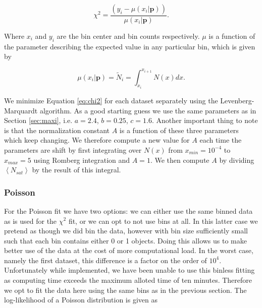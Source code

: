 \begin{equation}
    \chi^2 = \frac{\left(y_i - \mu(x_i | \boldsymbol{p})\right)}{\mu(x_i | \boldsymbol{p})}.\label{eq:chi2}
\end{equation}

Where $x_i$ and $y_i$ are the bin center and bin counts respectively. $\mu$ is a function of the parameter describing the expected value in any particular bin, which is given by

\begin{equation}
    \mu\left(x_i | \boldsymbol{p}\right) = \tilde N_i = \int_{x_i}^{x_{i+1}} N(x)dx.\label{eq:mean}
\end{equation}

We minimize Equation \ref{eq:chi2} for each dataset separately using the Levenberg-Marquardt algorithm. As a good starting guess we use the same parameters as in Section \ref{sec:maxi}, i.e. $a=2.4$, $b=0.25$, $c=1.6$. Another important thing to note is that the normalization constant $A$ is a function of these three parameters which keep changing. We therefore compute a new value for $A$ each time the parameters are shift by first integrating over $N(x)$ from $x_{min}=10^{-4}$ to $x_{max}=5$ using Romberg integration and $A=1$. We then compute $A$ by dividing $\left<N_{sat}\right>$ by the result of this integral.




\subsubsection{Poisson}

For the Poisson fit we have two options: we can either use the same binned data as is used for the $\chi^2$ fit, or we can opt to not use bins at all. In this latter case we pretend as though we did bin the data, however with bin size sufficiently small such that each bin contains either 0 or 1 objects. Doing this allows us to make better use of the data at the cost of more computational load. In the worst case, namely the first dataset, this difference is a factor on the order of $10^4$. Unfortunately while implemented, we have been unable to use this binless fitting as computing time exceeds the maximum alloted time of ten minutes. Therefore we opt to fit the data here using the same bins as in the previous section. The log-likelihood of a Poisson distribution is given as

